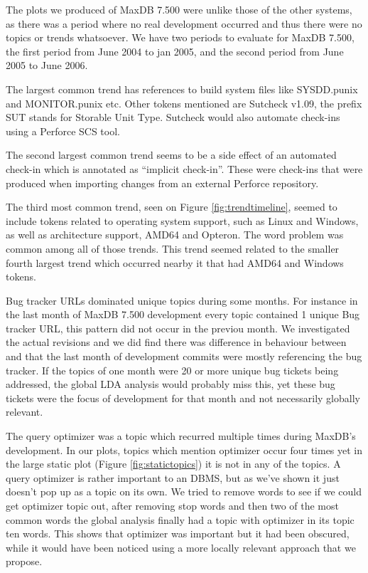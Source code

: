 \documentclass[times, 10pt,twocolumn]{article}
\begin{document}
The plots we produced of MaxDB 7.500 were 
unlike those of the other systems, as 
 there was a
period where no real development occurred and thus there were no topics or trends
whatsoever. We have two periods to evaluate for MaxDB 7.500, the first
period from June 2004 to jan 2005, and the second period from June
2005 to June 2006.

The largest common trend has references to build system files like
SYSDD.punix and MONITOR.punix etc. Other tokens mentioned are Sutcheck
v1.09, the prefix SUT stands for Storable Unit Type. Sutcheck would
also automate check-ins using a Perforce SCS tool.

The second largest common trend seems to be a side effect of an
automated check-in which is annotated as ``implicit check-in''. These
were check-ins that were produced when importing changes from an
external Perforce repository.

The third most common trend, seen on Figure \ref{fig:trendtimeline}, seemed to
include tokens related to operating system support, such as Linux and
Windows, as well as architecture support, AMD64 and Opteron. The word
problem was common among all of those trends. This trend seemed
related to the smaller fourth largest trend which occurred nearby it
that had AMD64 and Windows tokens.


Bug tracker URLs dominated unique topics during some months. For
instance in the last month of MaxDB 7.500 development every topic
contained 1 unique Bug tracker URL, this pattern did not occur in the
previou month. We investigated the actual revisions and we did find
there was difference in behaviour between and that the last month of
development commits were mostly referencing the bug tracker. If the
topics of one month were 20 or more unique bug tickets being
addressed, the global LDA analysis would probably miss this, yet these
bug tickets were the focus of development for that month and not
necessarily globally relevant.

The query optimizer was a topic which recurred multiple times during
MaxDB's development. In our plots, topics which mention optimizer
occur four times yet in the large static plot (Figure
\ref{fig:statictopics}) it is not in any of the topics. A query
optimizer is rather important to an DBMS, but as we've shown it just
doesn't pop up as a topic on its own. We tried to remove words to see
if we could get optimizer topic out, after removing stop words and
then two of the most common words the global analysis finally had a
topic with optimizer in its topic ten words. This shows that optimizer
was important but it had been obscured, while it would have been
noticed using a more locally relevant approach that we propose.
\end{document}
